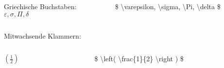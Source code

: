 \begin{frame}
\bigskip

\begin{columns}
\begin{column}{.4\textwidth}
Griechische Buchstaben:\\
$ \varepsilon, \sigma, \Pi, \delta $
\end{column}
\begin{column}{.6\textwidth}
{\ttfamily \color{unibayellowI} \$ \color{nounibaredI}\textbackslash varepsilon\color{black}, \color{nounibaredI}\textbackslash sigma\color{black}, \color{nounibaredI}\textbackslash Pi\color{black}, \color{nounibaredI}\textbackslash delta \color{unibayellowI} \$ }
\end{column}
\end{columns}

\bigskip
%
%

\medskip

\hspace{-4mm} Mitwachsende Klammern:\\ %
\medskip
\begin{columns}
\begin{column}{.2\textwidth}
\centering
$ \left( \frac{1}{2} \right) $
\end{column}
\begin{column}{.8\textwidth}
{\ttfamily \color{unibayellowI} \$ \color{nounibaredI}\textbackslash left\color{black}( \color{nounibaredI}\textbackslash frac\color{black}\{1\}\{2\} \color{nounibaredI}\textbackslash right\color{black} ) \color{unibayellowI} \$ }
\end{column}
\end{columns}


\end{frame}
